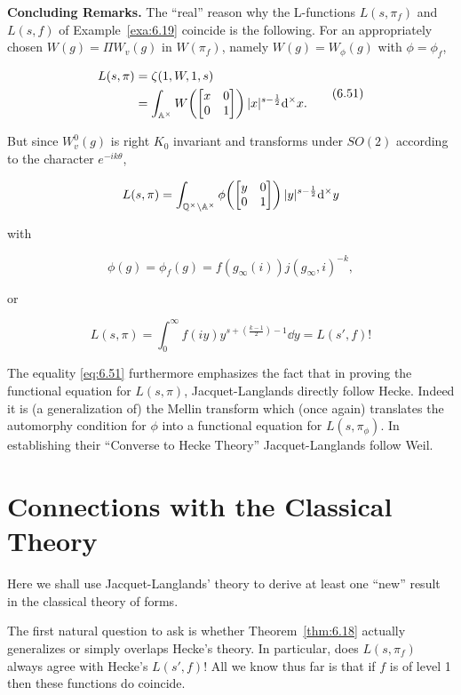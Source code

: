 \textbf{Concluding Remarks.} The ``real'' reason why the L-functions $L(s, \pi_f)$ and $L(s, f)$ of Example~\ref{exa:6.19} coincide is the following. For an appropriately chosen $W(g) = \Pi W_v(g)$ in $W(\pi_f)$, namely $W(g) = W_{\phi}(g)$ with $\phi = \phi_f$,

\begin{equation}\label{eq:6.51}
\begin{aligned}
L(s, \pi) &= \zeta(1, W, 1, s)\\
&= \int_{\mathbb{A}^{\times}} W\!\left(\begin{bmatrix} x & 0 \\ 0 & 1 \end{bmatrix}\right) |x|^{s - \frac{1}{2}} \mathrm{d}^{\times} x.
\end{aligned}\tag{6.51}
\end{equation}

But since $W_v^0(g)$ is right $K_0$ invariant and transforms under $SO(2)$ according to the character $e^{-ik\theta}$,

\[
L(s, \pi) = \int_{\mathbb{Q}^{\times} \backslash \mathbb{A}^{\times}} \phi\!\left(\begin{bmatrix} y & 0 \\ 0 & 1 \end{bmatrix}\right) |y|^{s - \frac{1}{2}} \mathrm{d}^{\times} y
\]

with

\[
\phi(g) = \phi_f(g) = f(g_{\infty}(i)) j(g_{\infty}, i)^{-k},
\]

or

\[
L(s, \pi) = \int_0^{\infty} f(iy) y^{s + \left(\frac{k-1}{2}\right) - 1} \dd y = L(s', f)!
\]

The equality \eqref{eq:6.51} furthermore emphasizes the fact that in proving the functional equation for $L(s,\pi)$, Jacquet-Langlands directly follow Hecke. Indeed it is (a generalization of) the Mellin transform which (once again) translates the automorphy condition for $\phi$ into a functional equation for $L(s,\pi_{\phi})$. In establishing their ``Converse to Hecke Theory'' Jacquet-Langlands follow Weil.

\section{Connections with the Classical Theory}\label{sec:6d}

Here we shall use Jacquet-Langlands' theory to derive at least one ``new'' result in the classical theory of forms.

The first natural question to ask is whether Theorem~\ref{thm:6.18} actually generalizes or simply overlaps Hecke's theory. In particular, does $L(s, \pi_f)$ always agree with Hecke's $L(s', f)!$ All we know thus far is that if $f$ is of level 1 then these functions do coincide.


